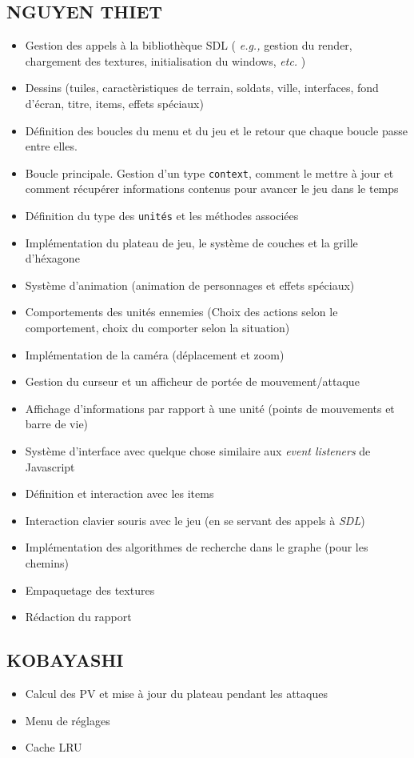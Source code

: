 \documentclass{article}
\begin{document}
\subsection{NGUYEN THIET}
\begin{itemize}
    \item Gestion des appels à la bibliothèque SDL ( \textit{e.g.,} gestion du render, chargement des textures, initialisation
    du windows, \textit{etc.} )
    \item Dessins (tuiles, caractèristiques de terrain, soldats, ville, interfaces, fond d'écran, titre, items, effets spéciaux)
    \item Définition des boucles du menu et du jeu et le retour que chaque boucle passe entre elles.
    \item Boucle principale. Gestion d'un type \texttt{context}, comment le mettre à jour et comment récupérer informations contenus pour avancer le jeu dans le temps
    \item Définition du type des \texttt{unités} et les méthodes associées
    \item Implémentation du plateau de jeu, le système de couches et la grille d'héxagone 
    \item Système d'animation (animation de personnages et effets spéciaux)
    \item Comportements des unités ennemies (Choix des actions selon le comportement, choix du comporter selon la situation)
    \item Implémentation de la caméra (déplacement et zoom)
    \item Gestion du curseur et un afficheur de portée de mouvement/attaque
    \item Affichage d'informations par rapport à une unité (points de mouvements et barre de vie)
    \item Système d'interface avec quelque chose similaire aux \textit{event listeners} de Javascript
    \item Définition et interaction avec les items
    \item Interaction clavier souris avec le jeu (en se servant des appels à \textit{SDL})
    \item Implémentation des algorithmes de recherche dans le graphe (pour les chemins)
    \item Empaquetage des textures
    \item Rédaction du rapport
\end{itemize}

\subsection{KOBAYASHI}
\begin{itemize}
    \item Calcul des PV et mise à jour du plateau pendant les attaques 
    \item Menu de réglages 
    \item Cache LRU %
\end{itemize}
\end{document}
